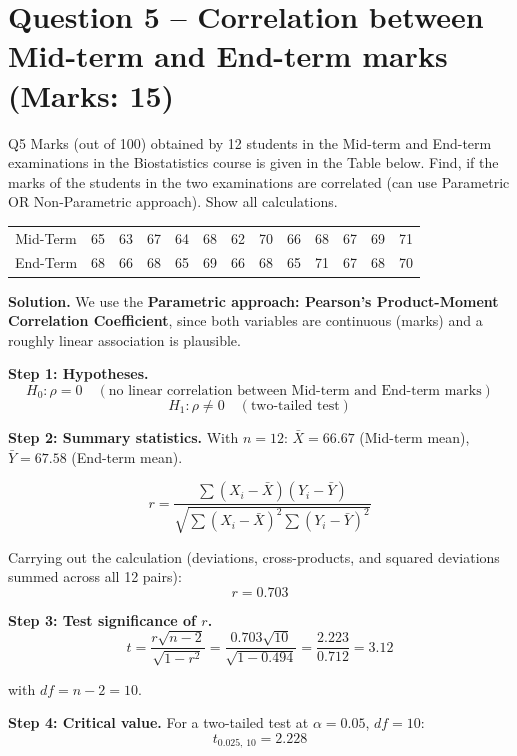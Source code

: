 \documentclass[11pt]{article}
\newcommand{\soln}{\par\noindent\textcolor{acolor}{\textbf{Solution.}}\quad}
\begin{document}
\section{Question 5 -- Correlation between Mid-term and End-term marks (Marks: 15)}
\begin{question}{Q5}
Marks (out of 100) obtained by 12 students in the Mid-term and End-term examinations in the Biostatistics course is given in the Table below. Find, if the marks of the students in the two examinations are correlated (can use Parametric OR Non-Parametric approach). Show all calculations.

\begin{center}
\begin{tabular}{c|cccccccccccc}
\toprule
Mid-Term & 65 & 63 & 67 & 64 & 68 & 62 & 70 & 66 & 68 & 67 & 69 & 71 \\
End-Term & 68 & 66 & 68 & 65 & 69 & 66 & 68 & 65 & 71 & 67 & 68 & 70 \\
\bottomrule
\end{tabular}
\end{center}
\end{question}

\soln
We use the \textbf{Parametric approach: Pearson's Product-Moment Correlation Coefficient}, since both variables are continuous (marks) and a roughly linear association is plausible.

\textbf{Step 1: Hypotheses.}
\[
H_0: \rho = 0 \quad (\text{no linear correlation between Mid-term and End-term marks})
\]
\[
H_1: \rho \neq 0 \quad (\text{two-tailed test})
\]

\textbf{Step 2: Summary statistics.}
With $n=12$: $\bar{X} = 66.67$ (Mid-term mean), $\bar{Y} = 67.58$ (End-term mean).

\[
r = \frac{\sum (X_i - \bar{X})(Y_i - \bar{Y})}{\sqrt{\sum(X_i-\bar{X})^2 \sum(Y_i-\bar{Y})^2}}
\]

Carrying out the calculation (deviations, cross-products, and squared deviations summed across all 12 pairs):
\[
\boxed{r = 0.703}
\]

\textbf{Step 3: Test significance of $r$.}
\[
t = \frac{r\sqrt{n-2}}{\sqrt{1-r^2}} = \frac{0.703\sqrt{10}}{\sqrt{1-0.494}} = \frac{2.223}{0.712} = 3.12
\]

with $df = n-2 = 10$.

\textbf{Step 4: Critical value.} For a two-tailed test at $\alpha=0.05$, $df=10$:
\[
t_{0.025,\,10} = 2.228
\]
\end{document}
